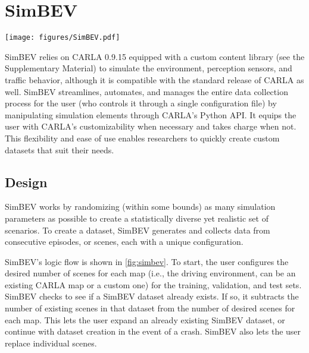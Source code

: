 \section{SimBEV} \label{sec:simbev}

\begin{figure*}[t]
    \centering
    \texttt{[image: figures/SimBEV.pdf]}
    \setlength{\abovecaptionskip}{-8 pt}
    \setlength{\belowcaptionskip}{-8 pt}
    \caption{SimBEV's logic flow when creating a new dataset. The arrow exiting green nodes at the top indicates the action taken when the condition in that node is no longer satisfied.}\label{fig:simbev}
\end{figure*}

SimBEV relies on CARLA 0.9.15 \cite{dosovitskiy2017carla} equipped with a custom content library (see the Supplementary Material) to simulate the environment, perception sensors, and traffic behavior, although it is compatible with the standard release of CARLA as well. SimBEV streamlines, automates, and manages the entire data collection process for the user (who controls it through a single configuration file) by manipulating simulation elements through CARLA's Python API. It equips the user with CARLA's customizability when necessary and takes charge when not. This flexibility and ease of use enables researchers to quickly create custom datasets that suit their needs.

\subsection{Design} \label{subsec:simbev-overview}

SimBEV works by randomizing (within some bounds) as many simulation parameters as possible to create a statistically diverse yet realistic set of scenarios. To create a dataset, SimBEV generates and collects data from consecutive episodes, or scenes, each with a unique configuration. 

SimBEV's logic flow is shown in \cref{fig:simbev}. To start, the user configures the desired number of scenes for each map (i.e., the driving environment, can be an existing CARLA map or a custom one) for the training, validation, and test sets. SimBEV checks to see if a SimBEV dataset already exists. If so, it subtracts the number of existing scenes in that dataset from the number of desired scenes for each map. This lets the user expand an already existing SimBEV dataset, or continue with dataset creation in the event of a crash. SimBEV also lets the user replace individual scenes.

